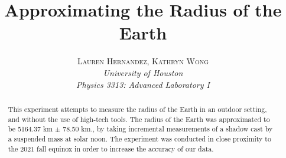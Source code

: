 \documentclass[twoside,10pt]{article}
\title{\vspace{-15mm}\fontsize{15pt}{10pt}\selectfont\textbf{Approximating the Radius of the Earth}} %
\author{
	\small
	\textsc{Lauren Hernandez, Kathryn Wong}\\[1mm] %
	\normalsize \textit{University of Houston}\\ %
	\normalsize \textit{Physics 3313: Advanced Laboratory I}\\ %
	\vspace{-10mm}
}
\date{}
\begin{document}
	
	\maketitle %
	
	\thispagestyle{fancy} %
	
	
	\begin{abstract}
		
		\noindent This experiment attempts to measure the radius of the Earth in an outdoor setting, and without the use of high-tech tools. The radius of the Earth was approximated to be 5164.37 km $\pm$ 78.50 km., by taking incremental measurements of a shadow cast by a suspended mass at solar noon. The experiment was conducted in close proximity to the 2021 fall equinox in order to increase the accuracy of our data. 
		
	\end{abstract}
	
	
\end{document}
